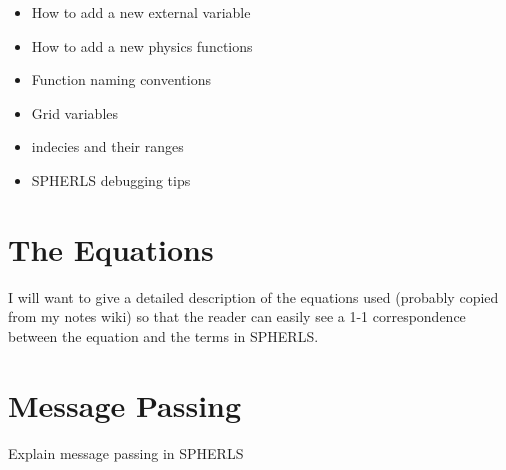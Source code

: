 \documentclass[12pt,a4paper]{book}
\begin{document}
\begin{itemize}
\begin{enumerate}
\end{enumerate}
\item How to add a new external variable
\item How to add a new physics functions
\item Function naming conventions
\item Grid variables
\item indecies and their ranges
\item SPHERLS debugging tips
\end{itemize}

\section{The Equations}
I will want to give a detailed description of the equations used (probably copied from my notes wiki) so that the reader can easily see a 1-1 correspondence between the equation and the terms in SPHERLS.

\section{Message Passing}
Explain message passing in SPHERLS
\end{document}
